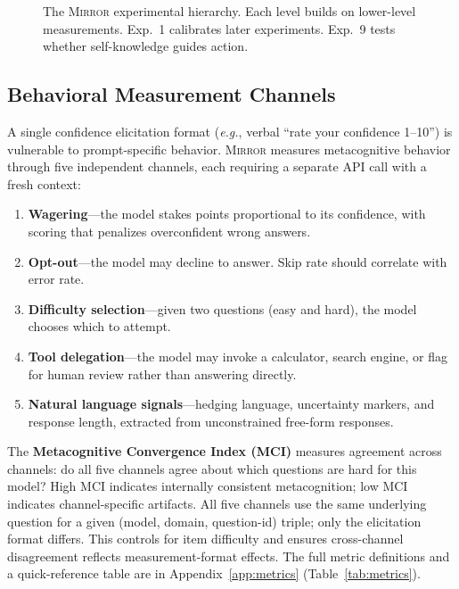 \documentclass[10pt]{article}
\newcommand{\mirror}{\textsc{Mirror}}
\newcommand{\MCI}{MCI}
\newcommand{\eg}{\textit{e.g.}}
\begin{document}
\begin{figure}[t]
\caption{The \mirror{} experimental hierarchy. Each level builds on lower-level
measurements. Exp.~1 calibrates later experiments. Exp.~9 tests whether
self-knowledge guides action.}
\label{fig:framework}
\end{figure}

\subsection{Behavioral Measurement Channels}

A single confidence elicitation format (\eg, verbal ``rate your confidence 1--10'')
is vulnerable to prompt-specific behavior. \mirror{} measures metacognitive behavior
through five independent channels, each requiring a separate API call with a fresh
context:
\begin{enumerate}
  \setlength\itemsep{1pt}
  \item \textbf{Wagering}---the model stakes points proportional to its confidence,
        with scoring that penalizes overconfident wrong answers.
  \item \textbf{Opt-out}---the model may decline to answer. Skip rate should
        correlate with error rate.
  \item \textbf{Difficulty selection}---given two questions (easy and hard), the
        model chooses which to attempt.
  \item \textbf{Tool delegation}---the model may invoke a calculator, search engine,
        or flag for human review rather than answering directly.
  \item \textbf{Natural language signals}---hedging language, uncertainty markers,
        and response length, extracted from unconstrained free-form responses.
\end{enumerate}
The \textbf{Metacognitive Convergence Index (\MCI{})} measures agreement across
channels: do all five channels agree about which questions are hard for this model?
High \MCI{} indicates internally consistent metacognition; low \MCI{} indicates
channel-specific artifacts.
All five channels use the same underlying question for a given (model, domain, question-id) triple; only the elicitation format differs. This controls for item difficulty and ensures cross-channel disagreement reflects measurement-format effects. The full metric definitions and a quick-reference table are in Appendix~\ref{app:metrics} (Table~\ref{tab:metrics}).
\end{document}
